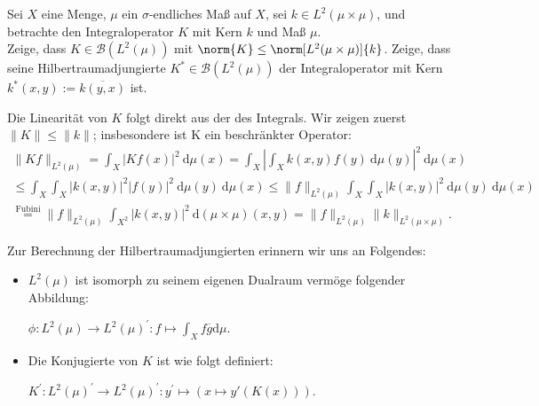 \begin{exercise}[IO/1]

Sei $X$ eine Menge, $\mu$ ein $\sigma$-endliches Maß auf $X$, sei $k \in L^2(\mu \times \mu)$, und betrachte den Integraloperator $K$ mit Kern $k$ und Maß $\mu$. \\

Zeige, dass $K \in \mathcal{B}(L^2(\mu))$ mit $\norm{K} \leq \norm[L^2(\mu \times \mu)]{k}$.
Zeige, dass seine Hilbertraumadjungierte $K^\ast \in \mathcal{B}(L^2(\mu))$ der Integraloperator mit Kern $k^\ast(x, y) := \overline{k(y, x)}$ ist.

\end{exercise}

\begin{solution}
  Die Linearität von $K$ folgt direkt aus der des Integrals.
  Wir zeigen zuerst $\|K\| \leq \|k\|$; insbesondere ist K ein beschränkter Operator:
  \begin{align}
      \|Kf\|_{L^2(\mu)} = \int_X |Kf(x)|^2 ~\mathrm{d}\mu(x)
      = \int_X \left|\int_X k(x,y) f(y) ~\mathrm{d}\mu(y)\right|^2 ~\mathrm{d}\mu(x) \\
      \leq \int_X \int_X |k(x,y)|^2 |f(y)|^2 ~\mathrm{d}\mu(y)
      ~\mathrm{d}\mu(x) \leq \|f\|_{L^2(\mu)} \int_X \int_X |k(x,y)|^2 ~\mathrm{d}\mu(y) ~\mathrm{d}\mu(x) \\ \stackrel{\text{Fubini}}{=} \|f\|_{L^2(\mu)} \int_{X^2} |k(x,y)|^2 ~\mathrm{d}(\mu\times\mu)(x,y)
      = \|f\|_{L^2(\mu)} \|k\|_{L^2(\mu\times\mu)}.
  \end{align}

  Zur Berechnung der Hilbertraumadjungierten erinnern wir uns an Folgendes:

  \begin{itemize}
      \item $L^2(\mu)$ ist isomorph zu seinem eigenen Dualraum vermöge folgender Abbildung:

      $\phi: L^2(\mu) \rightarrow L^2(\mu)^\prime: f \mapsto \int_X f\overline{g} \mathrm{d}\mu.$
      \item Die Konjugierte von $K$ ist wie folgt definiert:

      $K^\prime: L^2(\mu)^\prime \rightarrow L^2(\mu)^\prime:
      y^\prime \mapsto (x \mapsto y'(K(x))).$
  \end{itemize}


\end{solution}
